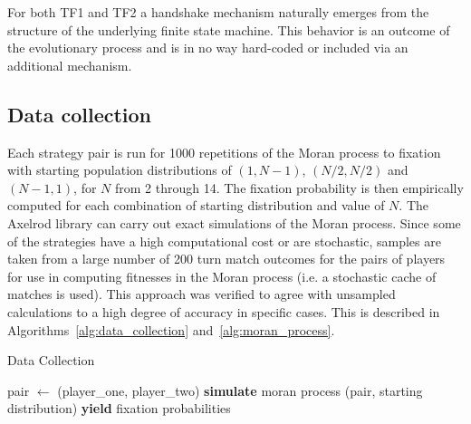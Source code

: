 \documentclass[10pt,letterpaper]{article}
\begin{document}
For both TF1 and TF2 a handshake
mechanism naturally emerges from the structure of the underlying finite state
machine. This behavior is an outcome of the evolutionary process and is in no
way hard-coded or included via an additional mechanism.

\begin{table}[!hbtp]
    \centering
        \caption{Memory depths}
        \label{tbl:memory_depth_count}
\end{table}

\subsection*{Data collection}

Each strategy pair is run for 1000 repetitions of the Moran process to fixation
with starting population distributions of $(1, N-1)$, $(N/2, N/2)$ and $(N-1 ,
1)$, for \(N\) from 2 through 14. The fixation probability is then empirically
computed for each combination of starting distribution and value of \(N\).  The
Axelrod library can carry out exact simulations of the Moran process. Since some
of the strategies have a high computational cost or are stochastic, samples are
taken from a large number of 200 turn match outcomes for the pairs of players
for use in computing fitnesses in the Moran process (i.e. a stochastic cache of
matches is used). This approach was verified to agree with unsampled
calculations to a high degree of accuracy in specific cases.  This is described
in Algorithms~\ref{alg:data_collection} and~\ref{alg:moran_process}.

\begin{algorithm}[!hbtp]
        \caption{Data Collection}
        \label{alg:data_collection}
          \begin{algorithmic}[1]
                \STATE pair $\gets$ (player\_one, player\_two)
                \STATE \textbf{simulate} moran process (pair, starting distribution)
                \ENDWHILE
                \STATE\textbf{yield} fixation probabilities
                \ENDFOR
              \ENDFOR
            \ENDFOR
          \end{algorithmic}
\end{algorithm}
\end{document}
